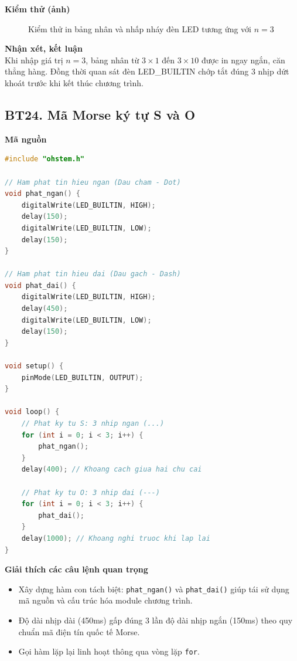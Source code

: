 \noindent\textbf{Kiểm thử (ảnh)}\\
\begin{figure}[H]
    \centering
    \caption{Kiểm thử in bảng nhân và nhấp nháy đèn LED tương ứng với $n = 3$}
    \label{fig:bt23}
\end{figure}

\noindent\textbf{Nhận xét, kết luận}\\
Khi nhập giá trị $n = 3$, bảng nhân từ $3 \times 1$ đến $3 \times 10$ được in ngay ngắn, căn thẳng hàng. Đồng thời quan sát đèn LED\_BUILTIN chớp tắt đúng 3 nhịp dứt khoát trước khi kết thúc chương trình.


\subsection*{BT24. Mã Morse ký tự S và O}

\noindent\textbf{Mã nguồn}\\
\begin{lstlisting}[language=C]
#include "ohstem.h"

// Ham phat tin hieu ngan (Dau cham - Dot)
void phat_ngan() {
    digitalWrite(LED_BUILTIN, HIGH);
    delay(150);
    digitalWrite(LED_BUILTIN, LOW);
    delay(150);
}

// Ham phat tin hieu dai (Dau gach - Dash)
void phat_dai() {
    digitalWrite(LED_BUILTIN, HIGH);
    delay(450);
    digitalWrite(LED_BUILTIN, LOW);
    delay(150);
}

void setup() {
    pinMode(LED_BUILTIN, OUTPUT);
}

void loop() {
    // Phat ky tu S: 3 nhip ngan (...)
    for (int i = 0; i < 3; i++) {
        phat_ngan();
    }
    delay(400); // Khoang cach giua hai chu cai

    // Phat ky tu O: 3 nhip dai (---)
    for (int i = 0; i < 3; i++) {
        phat_dai();
    }
    delay(1000); // Khoang nghi truoc khi lap lai
}
\end{lstlisting}

\noindent\textbf{Giải thích các câu lệnh quan trọng}\\
\begin{itemize}
    \item Xây dựng hàm con tách biệt: \texttt{phat\_ngan()} và \texttt{phat\_dai()} giúp tái sử dụng mã nguồn và cấu trúc hóa module chương trình.
    \item Độ dài nhịp dài (450ms) gấp đúng 3 lần độ dài nhịp ngắn (150ms) theo quy chuẩn mã điện tín quốc tế Morse.
    \item Gọi hàm lặp lại linh hoạt thông qua vòng lặp \texttt{for}.
\end{itemize}


